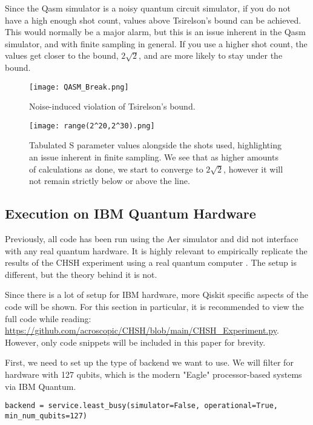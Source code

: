 \documentclass[12pt]{article}
\begin{document}
Since the Qasm simulator is a noisy quantum circuit simulator, if you do not have a high enough shot count, values above Tsirelson's bound can be achieved. This would normally be a major alarm, but this is an issue inherent in the Qasm simulator, and with finite sampling in general. If you use a higher shot count, the values get closer to the bound, $2\sqrt{2}$, and are more likely to stay under the bound. 

\begin{figure}[h]
    \centering
    \texttt{[image: QASM\_Break.png]}
    \caption{Noise-induced violation of Tsirelson's bound.}
    \label{fig:Qasm_violation_results}
\end{figure}

\begin{figure}[h]
    \centering
    \texttt{[image: range(2^20,2^30).png]}
    \caption{Tabulated S parameter values alongside the shots used, highlighting an issue inherent in finite sampling. We see that as higher amounts of calculations as done, we start to converge to $2\sqrt{2}$, however it will not remain strictly below or above the line.}
    \label{fig:Calculated_S_Values_Against_Shot_Range_2^20_2^30}
\end{figure}

\subsection{Execution on IBM Quantum Hardware}
Previously, all code has been run using the Aer simulator and did not interface with any real quantum hardware. It is highly relevant to empirically replicate the results of the CHSH experiment using a real quantum computer \cite{ibm_quantum}. The setup is different, but the theory behind it is not. 

Since there is a lot of setup for IBM hardware, more Qiskit specific aspects of the code will be shown. For this section in particular, it is recommended to view the full code while reading: \url{https://github.com/acroscopic/CHSH/blob/main/CHSH_Experiment.py}. However, only code snippets will be included in this paper for brevity.

First, we need to set up the type of backend we want to use. We will filter for hardware with 127 qubits, which is the modern "Eagle" processor-based systems via IBM Quantum\cite{ibm_quantum}.
\begin{lstlisting}[style=python]
backend = service.least_busy(simulator=False, operational=True, min_num_qubits=127)
\end{lstlisting}
\end{document}
